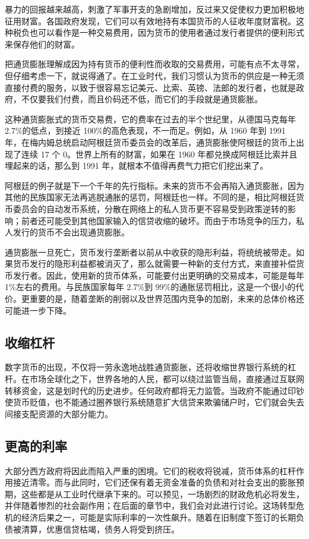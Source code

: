 暴力的回报越来越高，刺激了军事开支的急剧增加，反过来又促使权力更加积极地征用财富。各国政府发现，它们可以有效地持有本国货币的人征收年度财富税。这种税负也可以看作是一种交易费用，因为货币的使用者通过发行者提供的便利形式来保存他们的财富。

把通货膨胀理解成因为持有货币的便利性而收取的交易费用，可能有点不太寻常，但仔细考虑一下，就说得通了。在工业时代，我们习惯认为货币的供应是一种无须直接付费的服务，以致于很容易忘记美元、比索、英镑、法郎的发行者，也就是政府，不仅要我们付费，而且价码还不低，而它们的手段就是通货膨胀。

这种通货膨胀式的货币交易费，它的费率在过去的半个世纪里，从德国马克每年2.7\%的低点，到接近 100\%的高危表现，不一而足。例如，从 1960 年到 1991 年，在梅内姆总统启动阿根廷货币委员会的改革后，通货膨胀使阿根廷的货币上出现了连续 17 个 0。世界上所有的财富，如果在 1960 年都兑换成阿根廷比索并且埋起来的话，那么到 1991 年，就根本不值得再费气力把它们挖出来了。

阿根廷的例子就是下一个千年的先行指标。未来的货币不会再陷入通货膨胀，因为其他的民族国家无法再逃脱通胀的惩罚，阿根廷也一样。不同的是，相比阿根廷货币委员会的自动发币系统，分散在网络上的私人货币更不容易受到政策逆转的影响；前者还可能受到其他国家输入的信贷收缩的破坏。而由于市场竞争的压力，私人发行的货币不会出现通货膨胀。

通货膨胀一旦死亡，货币发行垄断者以前从中收获的隐形利益，将统统被带走。如果货币发行的隐形利益都被消灭了，那么就需要一种新的支付方式，来直接补偿货币发行者。因此，使用新的货币体系，可能要付出更明确的交易成本，可能是每年 1\%左右的费用。与民族国家每年 2.7\%到 99\%的通胀惩罚相比，这是一个很小的代价。更重要的是，随着垄断的削弱以及世界范围内竞争的加剧，未来的总体价格还可能进一步下降。

\subsection{收缩杠杆}
数字货币的出现，不仅将一劳永逸地战胜通货膨胀，还将收缩世界银行系统的杠杆。在市场全球化之下，世界各地的人民，都可以绕过监管当局，直接通过互联网转移资金，这是划时代的历史进步。任何政府都将无力监管。当政府不能通过印钞使货币贬值，也不能通过圈养银行系统随意扩大信贷来欺骗储户时，它们就会失去间接支配资源的大部分能力。

\subsection{更高的利率}
大部分西方政府将因此而陷入严重的困境。它们的税收将锐减，货币体系的杠杆作用接近清零。而与此同时，它们还保有着无资金准备的负债和对社会支出的膨胀预期，这些都是从工业时代继承下来的。可以预见，一场剧烈的财政危机必将发生，并伴随着惨烈的社会副作用；在后面的章节中，我们会对此进行讨论。这场转型危机的经济后果之一，可能是实际利率的一次性飙升。随着在旧制度下签订的长期负债被清算，优惠信贷枯竭，债务人将受到挤压。

